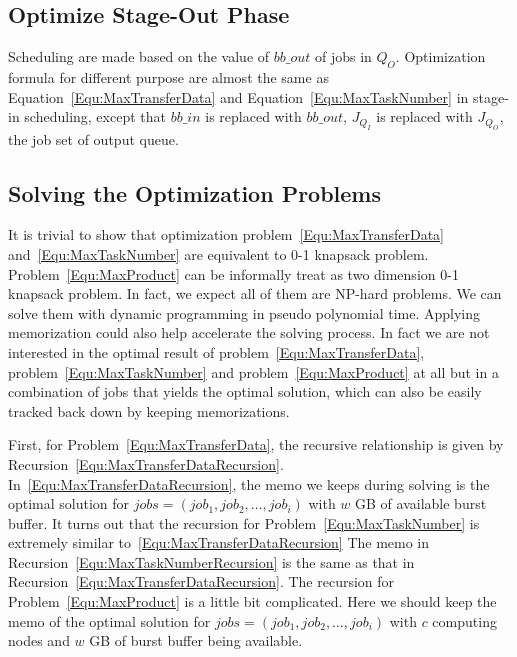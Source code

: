\subsection{Optimize Stage-Out Phase}
Scheduling are made based on the value of $bb\_out$ of jobs in $Q_O$.
Optimization formula for different purpose are almost the same as
Equation~\ref{Equ:MaxTransferData} and Equation~\ref{Equ:MaxTaskNumber}
in stage-in scheduling, except that $bb\_in$ is replaced with $bb\_out$,
$J_{Q_I}$ is replaced with $J_{Q_O}$, the job set of output queue.


\subsection{Solving the Optimization Problems}
It is trivial to show that optimization problem~\ref{Equ:MaxTransferData}
and~\ref{Equ:MaxTaskNumber}
are equivalent to 0-1 knapsack problem.
Problem~\ref{Equ:MaxProduct} can be informally treat as two dimension 0-1 knapsack problem.
In fact, we expect all of them are NP-hard problems.
We can solve them with dynamic programming in pseudo polynomial time.
Applying memorization could also help accelerate the solving process.
In fact we are not interested in the optimal result of problem~\ref{Equ:MaxTransferData},
problem~\ref{Equ:MaxTaskNumber} and problem~\ref{Equ:MaxProduct} at all
but in a combination of jobs that yields the optimal solution,
which can also be easily tracked back down by keeping memorizations.

First, for Problem~\ref{Equ:MaxTransferData}, the recursive relationship is
given by Recursion~\ref{Equ:MaxTransferDataRecursion}.
In~\ref{Equ:MaxTransferDataRecursion}, the memo we keeps during solving is
the optimal solution for 
$jobs=(job_1, job_2, \ldots, job_i)$ with $w$ GB of available burst buffer.
It turns out that the recursion for Problem~\ref{Equ:MaxTaskNumber} is
extremely similar to~\ref{Equ:MaxTransferDataRecursion}
The memo in Recursion~\ref{Equ:MaxTaskNumberRecursion} is the same
as that in Recursion~\ref{Equ:MaxTransferDataRecursion}.
The recursion for Problem~\ref{Equ:MaxProduct} is a little bit complicated.
Here we should keep the memo of the optimal solution for $jobs=(job_1, job_2, \ldots, job_i)$
with $c$ computing nodes and $w$ GB of burst buffer being available.


